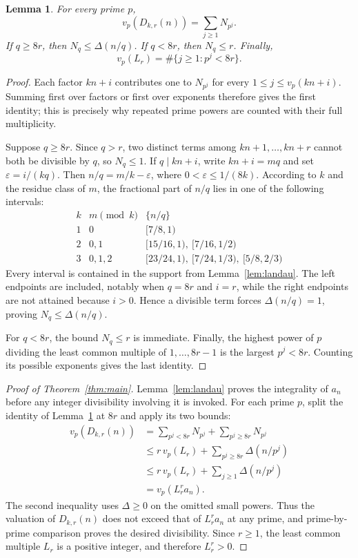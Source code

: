 \documentclass[11pt,a4paper]{amsart}
\newtheorem{lemma}[theorem]{Lemma}
\begin{document}
\begin{lemma}\label{lem:prime-powers}
For every prime $p$,
\[
 v_p(D_{k,r}(n))=\sum_{j\geq1}N_{p^j}.
\]
If $q\geq8r$, then $N_q\leq\Delta(n/q)$. If $q<8r$, then $N_q\leq r$.
Finally,
\[
 v_p(L_r)=\#\{j\geq1:p^j<8r\}.
\]
\end{lemma}

\begin{proof}
Each factor $kn+i$ contributes one to $N_{p^j}$ for every
$1\leq j\leq v_p(kn+i)$. Summing first over factors or first over exponents
therefore gives the first identity; this is precisely why repeated prime
powers are counted with their full multiplicity.

Suppose $q\geq8r$. Since $q>r$, two distinct terms among
$kn+1,\ldots,kn+r$ cannot both be divisible by $q$, so $N_q\leq1$. If
$q\mid kn+i$, write $kn+i=mq$ and set $\varepsilon=i/(kq)$. Then
$n/q=m/k-\varepsilon$, where $0<\varepsilon\leq1/(8k)$. According to $k$
and the residue class of $m$, the fractional part of $n/q$ lies in one of
the following intervals:
\[
\begin{array}{c|c|c}
 k & m\pmod{k} & \{n/q\} \\ \hline
 1 & 0 & [7/8,1) \\
 2 & 0,1 & [15/16,1),\ [7/16,1/2) \\
 3 & 0,1,2 & [23/24,1),\ [7/24,1/3),\ [5/8,2/3)
\end{array}
\]
Every interval is contained in the support from Lemma~\ref{lem:landau}.
The left endpoints are included, notably when $q=8r$ and $i=r$, while the
right endpoints are not attained because $i>0$. Hence a divisible term forces
$\Delta(n/q)=1$, proving $N_q\leq\Delta(n/q)$.

For $q<8r$, the bound $N_q\leq r$ is immediate. Finally, the highest power of
$p$ dividing the least common multiple of $1,\ldots,8r-1$ is the largest
$p^j<8r$. Counting its possible exponents gives the last identity.
\end{proof}

\begin{proof}[Proof of Theorem~\ref{thm:main}]
Lemma~\ref{lem:landau} proves the integrality of $a_n$ before any integer
divisibility involving it is invoked. For each prime $p$, split the identity
of Lemma~\ref{lem:prime-powers} at $8r$ and apply its two bounds:
\[
\begin{aligned}
 v_p(D_{k,r}(n))
 &=\sum_{p^j<8r}N_{p^j}+\sum_{p^j\geq8r}N_{p^j} \\
 &\leq r\,v_p(L_r)+\sum_{p^j\geq8r}\Delta(n/p^j) \\
 &\leq r\,v_p(L_r)+\sum_{j\geq1}\Delta(n/p^j) \\
 &=v_p(L_r^r a_n).
\end{aligned}
\]
The second inequality uses $\Delta\geq0$ on the omitted small powers. Thus
the valuation of $D_{k,r}(n)$ does not exceed that of $L_r^r a_n$ at any
prime, and prime-by-prime comparison proves the desired divisibility. Since
$r\geq1$, the least common multiple $L_r$ is a positive integer, and therefore
$L_r^r>0$.
\end{proof}
\end{document}
